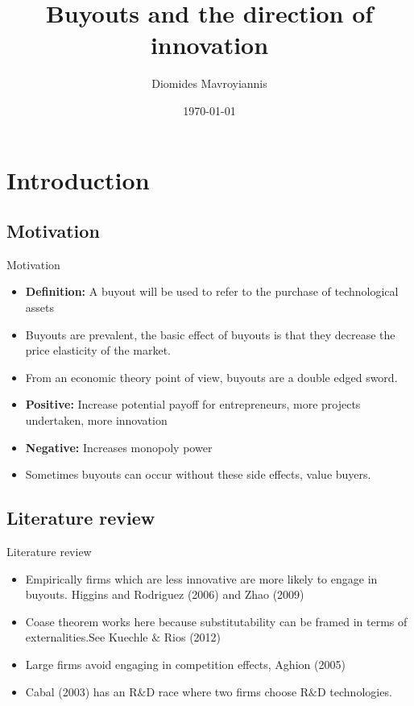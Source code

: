 \documentclass{beamer}
\title[Buyouts and the direction of innovation]{Buyouts and the direction of innovation} %
\author{Diomides Mavroyiannis} %
\institute[Dauphine] %
{
University of Paris 9, Paris Dauphine \\ %
\medskip%
}
\date{\today} %
\begin{document}
\begin{frame}
\titlepage %
\end{frame}

\setcounter{tocdepth}{1}
\section{Introduction}
\subsection{Motivation}
\begin{frame}{Motivation}
\begin{itemize}
    \item \textbf{Definition:} A buyout will be used to refer to the purchase of technological assets
    \item Buyouts are prevalent, the basic effect of buyouts is that they decrease the price elasticity of the market.  
    \item From an economic theory point of view, buyouts are a double edged sword.  
    \item \textbf{Positive:} Increase potential payoff for entrepreneurs, more projects undertaken, more innovation
    \item \textbf{Negative:} Increases monopoly power
    \item Sometimes buyouts can occur without these side effects, value buyers. 
\end{itemize}
\end{frame}

\subsection{Literature review}



\begin{frame}
\end{frame}

\begin{frame}{Literature review}
\begin{itemize}
    \item Empirically firms which are less innovative are more likely to engage in buyouts. Higgins and Rodriguez (2006) and Zhao (2009)
    \item Coase theorem works here because substitutability can be framed in terms of externalities.See Kuechle $\&$ Rios  (2012)
    \item Large firms avoid engaging in competition effects, Aghion (2005)
    \item Cabal (2003) has an R$\&$D race where two firms choose R$\&$D technologies. 
\end{itemize}
\end{frame}
\end{document}
